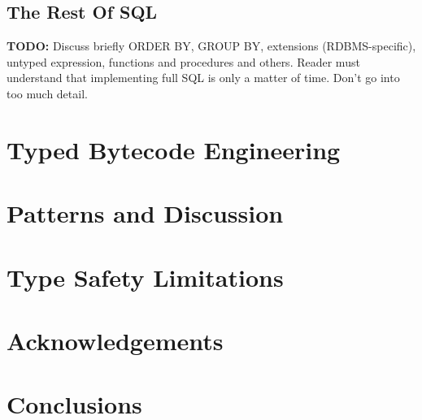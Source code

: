 \documentclass{sig-alternate}
\begin{document}
\subsection{The Rest Of SQL}

\textbf{TODO:} Discuss briefly ORDER BY, GROUP BY, extensions (RDBMS-specific), untyped expression, functions and procedures and others. Reader must understand that implementing full SQL is only a matter of time. Don't go into too much detail.

\section{Typed Bytecode Engineering}

\section{Patterns and Discussion}

\section{Type Safety Limitations}

\section{Acknowledgements}

\section{Conclusions}



\end{document}
